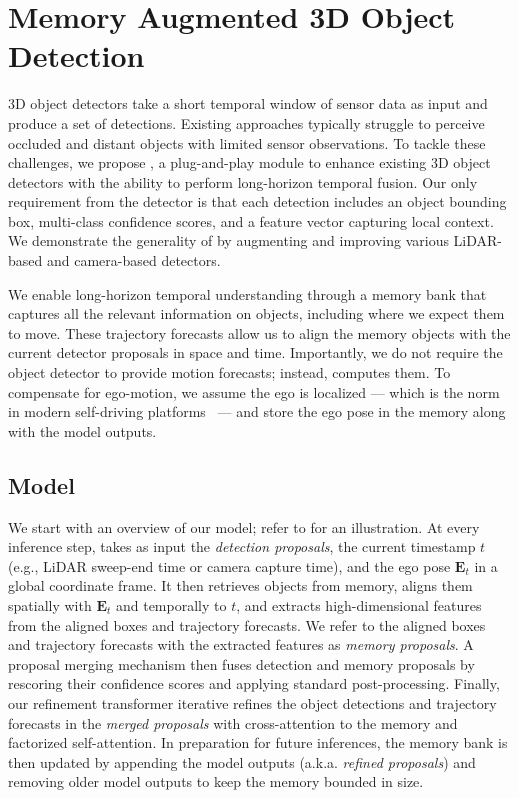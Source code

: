 \section{Memory Augmented 3D Object Detection}
\label{sec:method}

3D object detectors take a short temporal window of sensor data as input and produce a set of detections.
Existing approaches typically struggle to perceive occluded and distant objects with limited sensor observations.
To tackle these challenges, we propose \ourmodel{}, a plug-and-play module to enhance existing 3D object detectors with the ability to perform long-horizon temporal fusion.
Our only requirement from the detector is that each detection includes an object bounding box, multi-class confidence scores,
and a feature vector capturing local context.
We demonstrate the generality of \ourmodel{} by augmenting and improving various LiDAR-based and camera-based detectors.

We enable long-horizon temporal understanding through a memory bank that captures all the relevant information on objects,
including where we expect them to move.
These trajectory forecasts allow us to align the memory objects with the current detector proposals in space and time.
Importantly, we do not require the object detector to provide motion forecasts; instead, \ourmodel{} computes them.
To compensate for ego-motion, we assume the ego is localized --- which is the norm in modern self-driving platforms~\cite{wilson2023argoverse,WOD} --- and store the ego pose in the memory along with the model outputs.

\subsection{Model} \label{sec:method-arch}
We start with an overview of our model; refer to  for an illustration.
At every inference step, \ourmodel{} takes as input the \textit{detection proposals}, the current timestamp $t$ (e.g., LiDAR sweep-end time or camera capture time),
and the ego pose $\mathbf{E}_{t}$ in a global coordinate frame.
It then retrieves objects from memory, aligns them spatially with $\mathbf{E}_t$ and temporally to $t$, and extracts high-dimensional features from the aligned boxes and trajectory forecasts.
We refer to the aligned boxes and trajectory forecasts
with the extracted features as \textit{memory proposals}.
A proposal merging mechanism then fuses detection and memory proposals by rescoring their confidence scores and applying standard post-processing.
Finally, our refinement transformer iterative refines the object detections and trajectory forecasts in the \textit{merged proposals} with cross-attention to the memory and factorized self-attention.
In preparation for future inferences, the memory bank is then updated by appending the model outputs (a.k.a. \textit{refined proposals}) and removing older model outputs to keep the memory bounded in size. 

